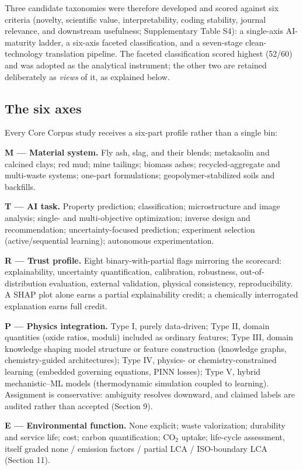 \documentclass[pdflatex,sn-basic]{sn-jnl}
\begin{document}
Three candidate taxonomies were therefore developed and scored against six criteria (novelty, scientific value, interpretability, coding stability, journal relevance, and downstream usefulness; Supplementary Table S4): a single-axis AI-maturity ladder, a six-axis faceted classification, and a seven-stage clean-technology translation pipeline. The faceted classification scored highest (52/60) and was adopted as the analytical instrument; the other two are retained deliberately as \emph{views} of it, as explained below.

\subsection{The six axes}

Every Core Corpus study receives a six-part profile rather than a single bin:

\textbf{M --- Material system.} Fly ash, slag, and their blends; metakaolin and calcined clays; red mud; mine tailings; biomass ashes; recycled-aggregate and multi-waste systems; one-part formulations; geopolymer-stabilized soils and backfills.

\textbf{T --- AI task.} Property prediction; classification; microstructure and image analysis; single- and multi-objective optimization; inverse design and recommendation; uncertainty-focused prediction; experiment selection (active/sequential learning); autonomous experimentation.

\textbf{R --- Trust profile.} Eight binary-with-partial flags mirroring the scorecard: explainability, uncertainty quantification, calibration, robustness, out-of-distribution evaluation, external validation, physical consistency, reproducibility. A SHAP plot alone earns a partial explainability credit; a chemically interrogated explanation earns full credit.

\textbf{P --- Physics integration.} Type I, purely data-driven; Type II, domain quantities (oxide ratios, moduli) included as ordinary features; Type III, domain knowledge shaping model structure or feature construction (knowledge graphs, chemistry-guided architectures); Type IV, physics- or chemistry-constrained learning (embedded governing equations, PINN losses); Type V, hybrid mechanistic--ML models (thermodynamic simulation coupled to learning). Assignment is conservative: ambiguity resolves downward, and claimed labels are audited rather than accepted (Section 9).

\textbf{E --- Environmental function.} None explicit; waste valorization; durability and service life; cost; carbon quantification; CO$_2$ uptake; life-cycle assessment, itself graded none / emission factors / partial LCA / ISO-boundary LCA (Section 11).
\end{document}
